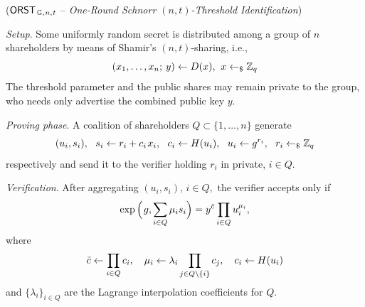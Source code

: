 \documentclass{iacrtrans}
\begin{document}
\begin{protocol}\label{orst_protocol}
($
\mathsf{ORST}
	_{\hspace{1pt}\mathbb{G},\hspace{0.5pt} n,\hspace{0.5pt} t}
$
-- \textit{One-Round Schnorr $(n, t)$-Threshold Identification})
\enumerate[label=$\circ$, leftmargin=17pt]
\vspace{2pt}
\item \textit{Setup}. Some uniformly random secret is
distributed among a group of $n$ shareholders
by means of Shamir's $(n, t)$-sharing, i.e.,
\vspace{5pt}
\begin{equation*}\label{orst_sharing}
(x_1, \dots, x_n;\hspace{2pt} y) \leftarrow D(x),
\hspace{4pt} x \leftarrow_\$ \mathbb{Z}_q
\vspace{5pt}
\end{equation*}
The threshold parameter and the public shares may remain private to the group,
who needs only advertise the combined public key $y$.
\vspace{5pt}
\item \textit{Proving phase}. A coalition of shareholders
$Q \subset \{1, \dots, n\}$ generate
\vspace{5pt}
\begin{equation*}
(u_i, s_i),
\ \ s_i \leftarrow r_i + c_i\hspace{1pt} x_i,
\ \ c_i \leftarrow H(u_i),
\ \ u_i \leftarrow g ^ {r_i},
\ \ r_i \leftarrow_\$ \mathbb{Z}_q
\vspace{5pt}
\end{equation*}
respectively and send it to the verifier holding $r_i$ in private, $i \in Q$.
\vspace{5pt}
\item \textit{Verification}.
After aggregating $(u_i, s_i),\hspace{2pt} i \in Q,$
the verifier accepts only if
\vspace{6pt}
\begin{equation}\label{orst_verification_0}
\exp\Big(\hspace{1pt}g, \sum_{i \in Q} \mu_i s_i\Big) =
y^{\bar{c}} \prod_{i \in Q} u_i ^ {\mu_i},
\vspace{-3pt}
\end{equation}
where
\vspace{2pt}
\begin{equation}\label{orst_aliases}
\bar{c} \leftarrow \prod_{i \in Q} c_i,
\ \ \  \mu_i \leftarrow \lambda_i \prod_{j \in Q \setminus \{i\}} c_j,
\ \ \  c_i \leftarrow H(u_i)
\vspace{8pt}
\end{equation}
and $\{\lambda_i\}_{i \in Q }$ are the
Lagrange interpolation coefficients for $Q$.
\vspace{5pt}
\end{protocol}
\end{document}
